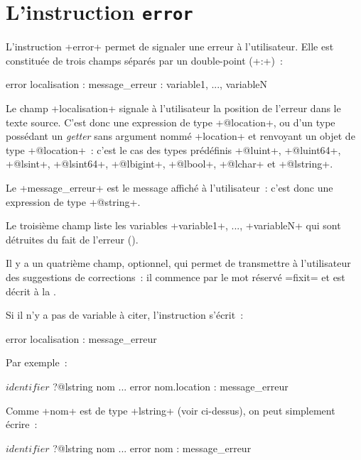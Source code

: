 \section{L'instruction \texttt{error}}

L'instruction \ggst+error+ permet de signaler une erreur à l'utilisateur. Elle est constituée de trois champs séparés par un double-point (\ggst+:+)~:

\begin{galgas3box}
error localisation : message_erreur : variable1, ..., variableN
\end{galgas3box}



Le champ \ggst+localisation+ signale à l'utilisateur la position de l'erreur dans le texte source. C'est donc une expression de type \ggst+@location+, ou d'un type possédant un \emph{getter} sans argument nommé \ggst+location+ et renvoyant un objet de type \ggst+@location+~: c'est le cas des types prédéfinis \ggst+@luint+, \ggst+@luint64+, \ggst+@lsint+, \ggst+@lsint64+, \ggst+@lbigint+, \ggst+@lbool+, \ggst+@lchar+ et \ggst+@lstring+.

Le \ggst+message_erreur+ est le message affiché à l'utilisateur~: c'est donc une expression de type \ggst+@string+.

Le troisième champ liste les variables \ggst+variable1+, ..., \ggst+variableN+ qui sont détruites du fait de l'erreur ().

Il y a un quatrième champ, optionnel, qui permet de transmettre à l'utilisateur des suggestions de corrections~: il commence par le mot réservé \ggst=fixit= et est décrit à la .

Si il n'y a pas de variable à citer, l'instruction s'écrit~:
\begin{galgas3}
error localisation : message_erreur
\end{galgas3}

Par exemple~:

\begin{galgas3}
$identifier$ ?@lstring nom
...
error nom.location : message_erreur
\end{galgas3}

Comme \ggst+nom+ est de type \ggst+lstring+ (voir ci-dessus), on peut simplement écrire~:
\begin{galgas3}
$identifier$ ?@lstring nom
...
error nom : message_erreur
\end{galgas3}


